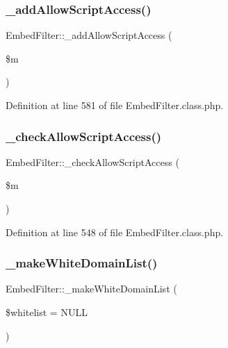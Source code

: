 \subsubsection{\texorpdfstring{\+\_\+add\+Allow\+Script\+Access()}{\_addAllowScriptAccess()}}
{\footnotesize\ttfamily Embed\+Filter\+::\+\_\+add\+Allow\+Script\+Access (\begin{DoxyParamCaption}\item[{}]{\$m }\end{DoxyParamCaption})}



Definition at line 581 of file Embed\+Filter.\+class.\+php.

\hypertarget{classEmbedFilter_a75054db2fbd30ab9392bbccf8dec3885}{}\label{classEmbedFilter_a75054db2fbd30ab9392bbccf8dec3885} 
\subsubsection{\texorpdfstring{\+\_\+check\+Allow\+Script\+Access()}{\_checkAllowScriptAccess()}}
{\footnotesize\ttfamily Embed\+Filter\+::\+\_\+check\+Allow\+Script\+Access (\begin{DoxyParamCaption}\item[{}]{\$m }\end{DoxyParamCaption})}



Definition at line 548 of file Embed\+Filter.\+class.\+php.

\hypertarget{classEmbedFilter_a9957ded7133614407948d1b2bc43a771}{}\label{classEmbedFilter_a9957ded7133614407948d1b2bc43a771} 
\subsubsection{\texorpdfstring{\+\_\+make\+White\+Domain\+List()}{\_makeWhiteDomainList()}}
{\footnotesize\ttfamily Embed\+Filter\+::\+\_\+make\+White\+Domain\+List (\begin{DoxyParamCaption}\item[{}]{\$whitelist = {\ttfamily NULL} }\end{DoxyParamCaption})}

